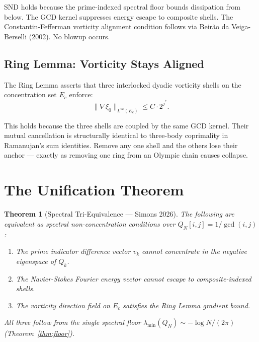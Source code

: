 \documentclass[11pt,reqno]{article}
\newtheorem{theorem}{Theorem}[section]
\begin{document}
SND holds because the prime-indexed spectral floor bounds dissipation
from below. The GCD kernel suppresses energy escape to composite shells.
The Constantin-Fefferman vorticity alignment condition follows via
Beirão da Veiga-Berselli (2002). No blowup occurs.

\subsection{Ring Lemma: Vorticity Stays Aligned}

The Ring Lemma asserts that three interlocked dyadic vorticity shells
on the concentration set $E_c$ enforce:
\[
\|\nabla\xi_0\|_{L^\infty(E_c)} \leq C \cdot 2^{j^*}.
\]

This holds because the three shells are coupled by the same GCD kernel.
Their mutual cancellation is structurally identical to three-body
coprimality in Ramanujan's sum identities.
Remove any one shell and the others lose their anchor ---
exactly as removing one ring from an Olympic chain causes collapse.

\section{The Unification Theorem}

\begin{theorem}[Spectral Tri-Equivalence --- Simons 2026]\label{thm:main}
The following are equivalent as spectral non-concentration conditions
over $Q_N[i,j] = 1/\gcd(i,j)$:

\begin{enumerate}
\item[\textbf{(GNC)}] The prime indicator difference vector $v_k$ cannot
  concentrate in the negative eigenspace of $Q_k$.
\item[\textbf{(SND)}] The Navier-Stokes Fourier energy vector cannot
  escape to composite-indexed shells.
\item[\textbf{(RL)}] The vorticity direction field on $E_c$ satisfies
  the Ring Lemma gradient bound.
\end{enumerate}

All three follow from the single spectral floor
$\lambda_{\min}(Q_N) \sim -\log N/(2\pi)$ (Theorem~\ref{thm:floor}).
\end{theorem}
\end{document}
